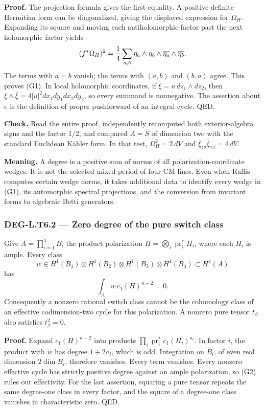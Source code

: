\documentclass[11pt,a4paper]{article}
\theoremstyle{definition}
\begin{document}
\textbf{Proof.} The projection formula gives the first equality. A positive definite Hermitian form can be diagonalized, giving the displayed expression for \(\Omega_H\). Expanding its square and moving each antiholomorphic factor past the next holomorphic factor yields \[
(f^*\Omega_H)^2={1\over4}\sum_{a,b}\eta_a\wedge\eta_b\wedge\overline{\eta_a}\wedge\overline{\eta_b}.
\] The terms with \(a=b\) vanish; the terms with \((a,b)\) and \((b,a)\) agree. This proves (G1). In local holomorphic coordinates, if \(\xi=u\,dz_1\wedge dz_2\), then \(\xi\wedge\bar\xi=4|u|^2dx_1dy_1dx_2dy_2\), so every summand is nonnegative. The assertion about \(e\) is the definition of proper pushforward of an integral cycle. QED.

\textbf{Check.} Read the entire proof, independently recomputed both exterior-algebra signs and the factor \(1/2\), and compared \(A=S\) of dimension two with the standard Euclidean Kähler form. In that test, \(\Omega_H^2=2\,dV\) and \(\xi_{12}\bar\xi_{12}=4\,dV\).

\textbf{Meaning.} A degree is a positive sum of norms of all polarization-coordinate wedges. It is not the selected mixed period of four CM lines. Even when Rallis computes certain wedge norms, it takes additional data to identify every wedge in (G1), its automorphic spectral projections, and the conversion from invariant forms to algebraic Betti generators.

\subsubsection{DEG-L.T6.2 --- Zero degree of the pure switch class}\label{DEG-L.T6.2}

Give \(A=\prod_{i=1}^4B_i\) the product polarization \(H=\bigotimes_i\operatorname{pr}_i^*H_i\), where each \(H_i\) is ample. Every class \[
w\in H^1(B_1)\otimes H^1(B_2)\otimes H^1(B_3)\otimes H^1(B_4)\subset H^4(A)
\] has \[
\int_A w\,c_1(H)^{n-2}=0.
\tag{G2}
\] Consequently a nonzero rational switch class cannot be the cohomology class of an effective codimension-two cycle for this polarization. A nonzero pure tensor \(t_\beta\) also satisfies \(t_\beta^2=0\).

\textbf{Proof.} Expand \(c_1(H)^{n-2}\) into products \(\prod_i\operatorname{pr}_i^*c_1(H_i)^{a_i}\). In factor \(i\), the product with \(w\) has degree \(1+2a_i\), which is odd. Integration on \(B_i\), of even real dimension \(2\dim B_i\), therefore vanishes. Every term vanishes. Every nonzero effective cycle has strictly positive degree against an ample polarization, so (G2) rules out effectivity. For the last assertion, squaring a pure tensor repeats the same degree-one class in every factor, and the square of a degree-one class vanishes in characteristic zero. QED.
\end{document}
